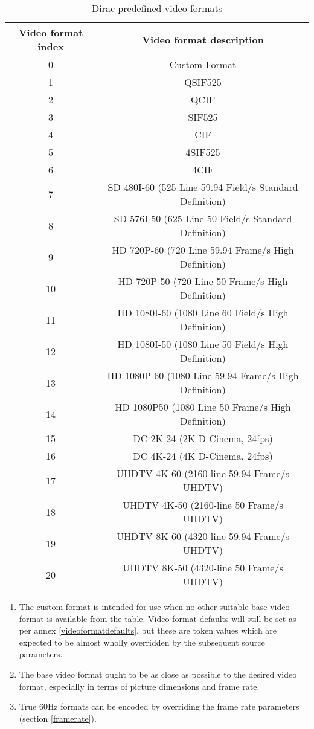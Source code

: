 \begin{table}[!ht]
\centering
\begin{tabular}{|c|c|}
\hline
\rowcolor[gray]{0.75}Video format index	& Video format description \\
\hline
0	& Custom Format\\
\hline
1	&	QSIF525\\
\hline
2	&	QCIF\\
\hline
3	&	SIF525\\
\hline
4	&	CIF\\
\hline
5	&	4SIF525\\
\hline
6	&	4CIF\\
\hline
7	&	SD 480I-60 (525 Line 59.94 Field/s Standard Definition)\\
\hline
8	&	SD 576I-50 (625 Line 50 Field/s Standard Definition)\\
\hline
9	&	HD 720P-60 (720 Line 59.94 Frame/s High Definition)\\
\hline
10 &	HD 720P-50 (720 Line 50 Frame/s High Definition)\\
\hline
11 &	HD 1080I-60 (1080 Line 60 Field/s High Definition)\\
\hline
12	&	HD 1080I-50 (1080 Line 50 Field/s High Definition)\\
\hline
13	&	HD 1080P-60 (1080 Line 59.94 Frame/s High Definition)\\
\hline
14	&	HD 1080P50 (1080 Line 50 Frame/s High Definition)\\
\hline
15	&	DC 2K-24 (2K D-Cinema, 24fps)\\
\hline
16	&	DC 4K-24 (4K D-Cinema, 24fps)\\
\hline
17	&	UHDTV 4K-60 (2160-line 59.94 Frame/s UHDTV)\\
\hline
18	&	UHDTV 4K-50 (2160-line 50 Frame/s UHDTV)\\
\hline
19	&	UHDTV 8K-60 (4320-line 59.94 Frame/s UHDTV)\\
\hline
20	&	UHDTV 8K-50 (4320-line 50 Frame/s UHDTV)\\
\hline
\end{tabular}
\caption{Dirac predefined video formats}
\label{table:videoformats}
\end{table}

\begin{informative}
\begin{enumerate}
\item The custom format is intended for use when no other suitable base video 
format is available from the table. Video format defaults will still be set as 
per annex \ref{videoformatdefaults}, but these are token values which are expected 
to be almost wholly overridden by the subsequent source parameters. 
\item The base video format ought to be as close as possible to the desired video
format, especially in terms of picture dimensions and frame rate.
\item True 60Hz formats can be encoded by overriding the frame rate parameters
(section \ref{framerate}).
 \end{enumerate}
\end{informative}

